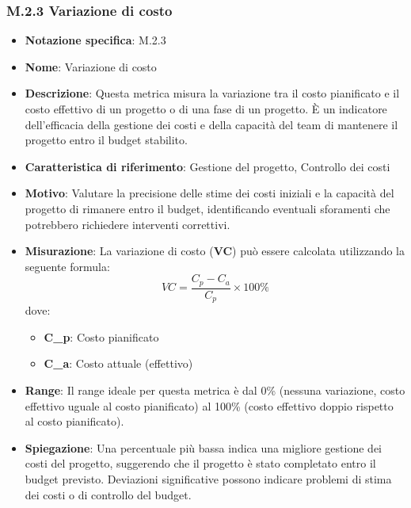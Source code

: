 \subsubsection{M.2.3 Variazione di costo}
\begin{itemize}
    \item \textbf{Notazione specifica}: M.2.3
    \item \textbf{Nome}: Variazione di costo
    \item \textbf{Descrizione}: Questa metrica misura la variazione tra il costo pianificato e il costo effettivo di un progetto o di una fase di un progetto. È un indicatore dell'efficacia della gestione dei costi e della capacità del team di mantenere il progetto entro il budget stabilito.
    \item \textbf{Caratteristica di riferimento}: Gestione del progetto, Controllo dei costi
    \item \textbf{Motivo}: Valutare la precisione delle stime dei costi iniziali e la capacità del progetto di rimanere entro il budget, identificando eventuali sforamenti che potrebbero richiedere interventi correttivi.
    \item \textbf{Misurazione}: La variazione di costo (\textbf{VC}) può essere calcolata utilizzando la seguente formula:
    \[ VC = \frac{C_p - C_a}{C_p} \times 100\% \]
    dove:
    \begin{itemize}
        \item \textbf{C_p}: Costo pianificato
        \item \textbf{C_a}: Costo attuale (effettivo)
    \end{itemize}
    \item \textbf{Range}: Il range ideale per questa metrica è dal 0\% (nessuna variazione, costo effettivo uguale al costo pianificato) al 100\% (costo effettivo doppio rispetto al costo pianificato).
    \item \textbf{Spiegazione}: Una percentuale più bassa indica una migliore gestione dei costi del progetto, suggerendo che il progetto è stato completato entro il budget previsto. Deviazioni significative possono indicare problemi di stima dei costi o di controllo del budget.
\end{itemize}
